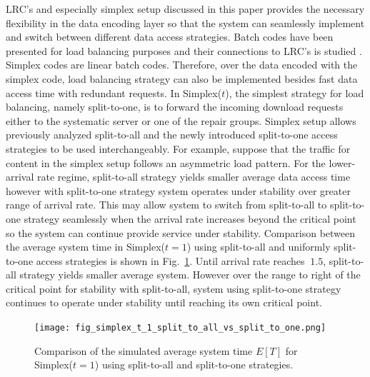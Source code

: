 \documentclass[sigconf,draft]{acmart}
\begin{document}
LRC's and especially simplex setup discussed in this paper provides the necessary flexibility in the data encoding layer so that the system can seamlessly implement and switch between different data access strategies. Batch codes have been presented for load balancing purposes \cite{ishai2004batch} and their connections to LRC's is studied \cite{skachek2016batch}. Simplex codes are linear batch codes. Therefore, over the data encoded with the simplex code, load balancing strategy can also be implemented besides fast data access time with redundant requests. In Simplex($t$), the simplest strategy for load balancing, namely split-to-one, is to forward the incoming download requests either to the systematic server or one of the repair groups. Simplex setup allows previously analyzed split-to-all and the newly introduced split-to-one access strategies to be used interchangeably. For example, suppose that the traffic for content in the simplex setup follows an asymmetric load pattern. For the lower-arrival rate regime, split-to-all strategy yields smaller average data access time however with split-to-one strategy system operates under stability over greater range of arrival rate. This may allow system to switch from split-to-all to split-to-one strategy seamlessly when the arrival rate increases beyond the critical point so the system can continue provide service under stability. Comparison between the average system time in Simplex($t=1$) using split-to-all and uniformly split-to-one access strategies is shown in Fig.~\ref{fig:fig_simplex_t_1_split_to_all_vs_split_to_one}. Until arrival rate reaches $~1.5$, split-to-all strategy yields smaller average system. However over the range to right of the critical point for stability with split-to-all, system using split-to-one strategy continues to operate under stability until reaching its own critical point.
\begin{figure}[h]
  \centering
  \texttt{[image: fig\_simplex\_t\_1\_split\_to\_all\_vs\_split\_to\_one.png]}
  \caption{Comparison of the simulated average system time $E[T]$ for Simplex($t=1$) using split-to-all and split-to-one strategies.}
  \label{fig:fig_simplex_t_1_split_to_all_vs_split_to_one}
\end{figure}
\end{document}
